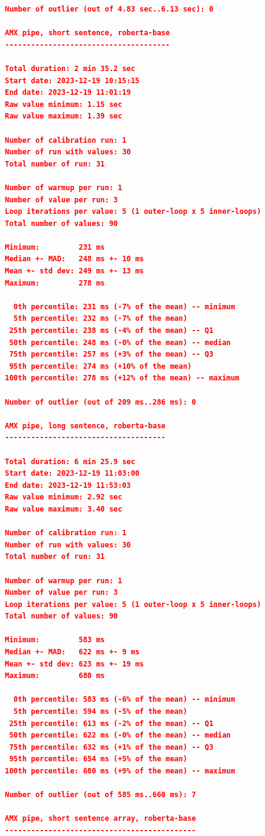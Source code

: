 \begin{lstlisting}[language=json]
Number of outlier (out of 4.83 sec..6.13 sec): 0

AMX pipe, short sentence, roberta-base
--------------------------------------

Total duration: 2 min 35.2 sec
Start date: 2023-12-19 10:15:15
End date: 2023-12-19 11:01:19
Raw value minimum: 1.15 sec
Raw value maximum: 1.39 sec

Number of calibration run: 1
Number of run with values: 30
Total number of run: 31

Number of warmup per run: 1
Number of value per run: 3
Loop iterations per value: 5 (1 outer-loop x 5 inner-loops)
Total number of values: 90

Minimum:         231 ms
Median +- MAD:   248 ms +- 10 ms
Mean +- std dev: 249 ms +- 13 ms
Maximum:         278 ms

  0th percentile: 231 ms (-7% of the mean) -- minimum
  5th percentile: 232 ms (-7% of the mean)
 25th percentile: 238 ms (-4% of the mean) -- Q1
 50th percentile: 248 ms (-0% of the mean) -- median
 75th percentile: 257 ms (+3% of the mean) -- Q3
 95th percentile: 274 ms (+10% of the mean)
100th percentile: 278 ms (+12% of the mean) -- maximum

Number of outlier (out of 209 ms..286 ms): 0

AMX pipe, long sentence, roberta-base
-------------------------------------

Total duration: 6 min 25.9 sec
Start date: 2023-12-19 11:03:00
End date: 2023-12-19 11:53:03
Raw value minimum: 2.92 sec
Raw value maximum: 3.40 sec

Number of calibration run: 1
Number of run with values: 30
Total number of run: 31

Number of warmup per run: 1
Number of value per run: 3
Loop iterations per value: 5 (1 outer-loop x 5 inner-loops)
Total number of values: 90

Minimum:         583 ms
Median +- MAD:   622 ms +- 9 ms
Mean +- std dev: 623 ms +- 19 ms
Maximum:         680 ms

  0th percentile: 583 ms (-6% of the mean) -- minimum
  5th percentile: 594 ms (-5% of the mean)
 25th percentile: 613 ms (-2% of the mean) -- Q1
 50th percentile: 622 ms (-0% of the mean) -- median
 75th percentile: 632 ms (+1% of the mean) -- Q3
 95th percentile: 654 ms (+5% of the mean)
100th percentile: 680 ms (+9% of the mean) -- maximum

Number of outlier (out of 585 ms..660 ms): 7

AMX pipe, short sentence array, roberta-base
--------------------------------------------


\end{lstlisting}

